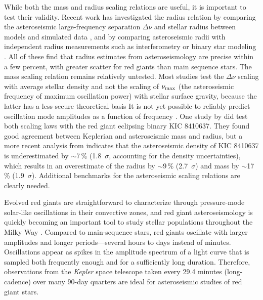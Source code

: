While both the mass and radius scaling relations are useful, it is important to test their validity. Recent work has investigated the radius relation by comparing the asteroseismic large-frequency separation $\Delta \nu$ and stellar radius between models and simulated data \citep[e.g.][]{ste09,whi11,mig13}, and by comparing asteroseismic radii with independent radius measurements such as interferometry or binary star modeling \citep[e.g.][]{hub11,hub12,sil12}. All of these find that radius estimates from asteroseismology are precise within a few percent, with greater scatter for red giants than main sequence stars. The mass scaling relation remains relatively untested. Most studies test the $\Delta\nu$ scaling with average stellar density and not the scaling of $\nu_{\rm{max}}$ (the asteroseismic frequency of maximum oscillation power) with stellar surface gravity, because the latter has a less-secure theoretical basis  It is not yet possible to reliably predict oscillation mode amplitudes as a function of frequency \citep{chr12}. One study by \citet{fra13} did test both scaling laws with the red giant eclipsing binary KIC 8410637. They found good agreement between Keplerian and asteroseismic mass and radius, but a more recent analysis from \citet{hub14} indicates that the asteroseismic density of KIC 8410637 is underestimated by $\sim$7\,\% (1.8~$\sigma$, accounting for the density uncertainties), which results in an overestimate of the radius by $\sim$9\,\% (2.7~$\sigma$) and mass by $\sim$17\,\% (1.9~$\sigma$). Additional benchmarks for the asteroseismic scaling relations are clearly needed.

Evolved red giants are straightforward to characterize through pressure-mode solar-like oscillations in their convective zones, and red giant asteroseismology is quickly becoming an important tool to study stellar populations throughout the Milky Way \citep[for a review of this topic, see][]{cha13}. Compared to main-sequence stars, red giants oscillate with larger amplitudes and longer periods---several hours to days instead of minutes. Oscillations appear as spikes in the amplitude spectrum of a light curve that is sampled both frequently enough and for a sufficiently long duration. Therefore, observations from the \emph{Kepler} space telescope taken every 29.4 minutes (long-cadence) over many 90-day quarters are ideal for asteroseismic studies of red giant stars.

